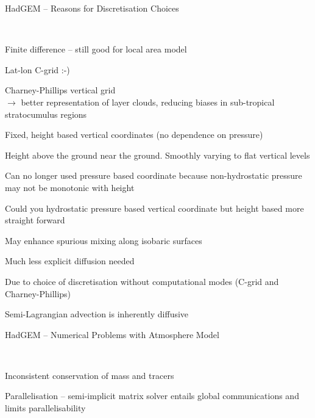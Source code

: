 \begin{slide}{HadGEM -- Reasons for Discretisation Choices}

\ \\
\begin{list1}

\item Finite difference -- still good for local area model

\item Lat-lon C-grid :-)

\item Charney-Phillips vertical grid\\
$\rightarrow$ better representation of layer clouds, reducing biases in sub-tropical stratocumulus regions

\item Fixed, height based vertical coordinates (no dependence on pressure)
\begin{list2}
\item Height above the ground near the ground. Smoothly varying to flat vertical levels
\item Can no longer used pressure based coordinate because non-hydrostatic pressure may not be monotonic with height
\item Could you hydrostatic pressure based vertical coordinate but height based more straight forward
\item May enhance spurious mixing along isobaric surfaces
\end{list2}

\item Much less explicit diffusion needed
\begin{list2}
\item Due to choice of discretisation without computational modes (C-grid and Charney-Phillips)
\item Semi-Lagrangian advection is inherently diffusive
\end{list2}

\end{list1}
\end{slide}

\begin{slide}{HadGEM -- Numerical Problems with Atmosphere Model}

\ \\
\begin{list0}
\item Inconsistent conservation of mass and tracers
\item Parallelisation -- semi-implicit matrix solver entails global communications and limits parallelisability
\end{list0}
\end{slide}


